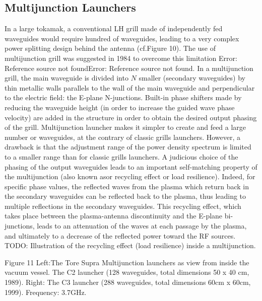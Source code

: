 \subsection{Multijunction Launchers}
In a large tokamak, a conventional LH grill made of independently fed waveguides would require hundred of waveguides, leading to a very complex power splitting design behind the antenna (cf.Figure 10). The use of multijunction grill was suggested in 1984 to overcome this limitation Error: Reference source not foundError: Reference source not found. In a multijunction grill, the main waveguide is divided into $N$ smaller (secondary waveguides) by thin metallic walls parallels to the wall of the main waveguide and perpendicular to the electric field: the E-plane N-junctions. Built-in phase shifters made by reducing the waveguide height (in order to increase the guided wave phase velocity) are added in the structure in order to obtain the desired output phasing of the grill. Multijunction launcher makes it simpler to create and feed a large number or waveguides, at the contrary of classic grills launchers. However, a drawback is that the adjustment range of the power density spectrum is limited to a smaller range than for classic grills launchers.
A judicious choice of the phasing of the output waveguides leads to an important self-matching property of the multijunction (also known asor recycling effect or load resilience). Indeed, for specific phase values, the reflected waves from the plasma which return back in the secondary waveguides can be reflected back to the plasma, thus leading to multiple reflections in the secondary waveguides. This recycling effect, which takes place between the plasma-antenna discontinuity and the E-plane bi-junctions, leads to an attenuation of the waves at each passage by the plasma, and ultimately to a decrease of the reflected power toward the RF sources. 
TODO: Illustration of the recycling effect (load resilience) inside a multijunction.


Figure 11 Left:The Tore Supra Multijunction launchers as view from inside the vacuum vessel. The C2 launcher (128 waveguides, total dimensions 50 x 40 cm, 1989). Right: The C3 launcher (288 waveguides, total dimensions 60cm x 60cm, 1999). Frequency: 3.7GHz. 

